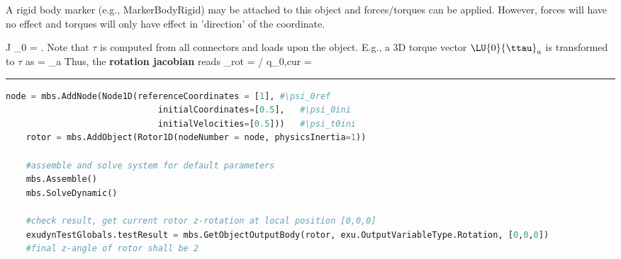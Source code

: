     \finishTable
    A rigid body marker (e.g., MarkerBodyRigid) may be attached to this object and forces/torques can be applied. 
    However, forces will have no effect and torques will only have effect in 'direction' of the coordinate.

    \be 
      J \cdot \ddot \psi_0 = \tau.
    \ee
    Note that $\tau$ is computed from all connectors and loads upon the object. E.g., a 3D torque vector $\LU{0}{\ttau}_a$ is 
    transformed to $\tau$ as
    \be
      \tau =  _a
    \ee
    Thus, the {\bf rotation jacobian} reads 
    \be
      \Jm_{rot} = \partial \tomega\cCur / \partial \dot q_{0,cur} = 
        
    \ee
\vspace{6pt}\par\noindent\rule{\textwidth}{0.4pt}
\label{miniExample_ObjectRotationalMass1D}
\pythonstyle
\begin{lstlisting}[language=Python, firstnumber=1]
    node = mbs.AddNode(Node1D(referenceCoordinates = [1], #\psi_0ref
                              initialCoordinates=[0.5],   #\psi_0ini
                              initialVelocities=[0.5]))   #\psi_t0ini
    rotor = mbs.AddObject(Rotor1D(nodeNumber = node, physicsInertia=1))

    #assemble and solve system for default parameters
    mbs.Assemble()
    mbs.SolveDynamic()

    #check result, get current rotor z-rotation at local position [0,0,0]
    exudynTestGlobals.testResult = mbs.GetObjectOutputBody(rotor, exu.OutputVariableType.Rotation, [0,0,0])
    #final z-angle of rotor shall be 2
\end{lstlisting}

